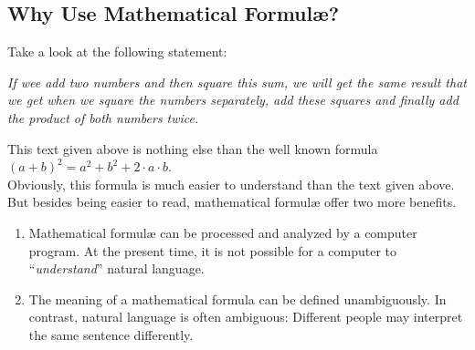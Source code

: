 \subsection{Why Use Mathematical {Formul\ae}?}
Take a look at the following statement:
\begin{center}
\begin{minipage}{14cm}
{\em 
  If wee add two numbers and then square this sum,  we will get the same result that we get
  when we square the numbers separately, add these squares and finally add the product of
  both numbers twice.
}
\end{minipage}
\end{center}
This text given above is nothing else than the well known formula 
\\[0.2cm]
\hspace*{1.3cm} $(a+b)^2 = a^2 + b^2 + 2\cdot a\cdot b$. 
\\[0.2cm]
Obviously, this formula is much easier to understand than the text given above.
But besides being easier to read, mathematical {formul\ae} offer two more benefits.
\begin{enumerate}
\item Mathematical {formul\ae} can be processed and analyzed by a computer program.
      At the present time, it is not possible for a computer to ``\emph{understand}''
      natural language.
\item The meaning of a mathematical formula can be defined unambiguously.
      In contrast, natural language is often ambiguous:  Different people may interpret
      the same sentence differently.
\end{enumerate}

